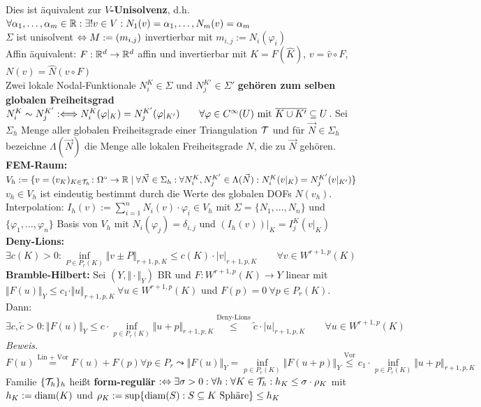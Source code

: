 \documentclass[12pt]{scrartcl}
\begin{document}
	Dies ist äquivalent zur \textbf{$V$-Unisolvenz}, d.h. $\forall\alpha_1,\ldots,\alpha_m\in\R:\exists! v\in V:N_1(v)=\alpha_1,\ldots,N_m(v)=\alpha_m$\\
	$\Sigma$ ist unisolvent $\gdw M:=(m_{i,j})$ invertierbar mit $m_{i,j}:=N_i(\varphi_i)$\\
	Affin äquivalent: $F:\R^d\to\R^d$ affin und invertierbar mit $K=F(\hat{K})$, $v=\hat{v}\circ F$, $N(v)=\hat{N}(v\circ F)$\\
	Zwei lokale Nodal-Funktionale $N_i^K\in\Sigma$ und $N_j^{K'}\in\Sigma'$ \textbf{gehören zum selben globalen Freiheitsgrad} $N_i^K\sim N_j^{K'}:\Longleftrightarrow N_i^K(\varphi|_K)=N_j^{K'}(\varphi|_{K'})\qquad\forall\varphi\in C^\infty(U)\mit\overline{K\cup K'}\subseteq U$.
	Sei $\Sigma_h$ Menge aller globalen Freiheitsgrade einer Triangulation $\T$ und für $\vec{N}\in\Sigma_h$ bezeichne $\Lambda(\vec{N})$ die Menge alle lokalen Freiheitsgrade $N$, die zu $\vec{N}$ gehören.\\
	\textbf{FEM-Raum:} $V_h:=\lbrace v=(v_{K})_{K\in\T_h}\colon\Omega^\circ\to\R\mid \forall \vec{N}\in\Sigma_h:\forall N_i^{K},N_j^{K'}\in\Lambda(\vec{N}):N_i^{K}(v|_K)=N_j^{K'}(v|_{K'})\rbrace$\\
	$v_h\in V_h$ ist eindeutig bestimmt durch die Werte des globalen DOFs $N(v_h)$.\\
	Interpolation: $I_h(v):=\sum\limits_{i=1}^n N_i(v)\cdot\varphi_i\in V_h$ mit $\Sigma=\lbrace N_1,\ldots,N_n\rbrace$ und $\lbrace\varphi_1,\ldots,\varphi_n\rbrace$ Basis von $V_h$ mit $N_i(\varphi_j)=\delta_{i,j}$ und $(I_h(v))|_K=I_j^K(v|_K)$\\
	\textbf{Deny-Lions:} $\exists c(K)>0:\inf\limits_{P\in P_r(K)}\Vert v\pm P\Vert_{r+1,p,K}\leq c(K)\cdot |v|_{r+1,p,K}\qquad\forall v\in W^{r+1,p}(K)$\\
	\textbf{Bramble-Hilbert:} Sei $(Y,\Vert\cdot\Vert_Y)$ BR und $F:W^{r+1,p}(K)\to Y$ linear mit $\big\Vert F(u)\Vert_Y\leq c_1\cdot\Vert u\Vert_{r+1,p,K}~\forall u\in W^{r+1,p}(K)$ und $F(p)=0~\forall p\in P_r(K)$.\\
	Dann: $\exists c,\tilde{c}>0:\big\Vert F(u)\big\Vert_Y
		\leq c\cdot\inf\limits_{p\in P_r(K)}\Vert u+p\Vert_{r+1,p,K}
		\overset{\text{Deny-Lions}}{\leq}
		\tilde{c}\cdot |u|_{r+1,p,K}\qquad\forall u\in W^{r+1,p}(K)$\\
	\textit{Beweis.} $F(u)\overset{\text{Lin + Vor}}{=}F(u)+F(p)\forall p\in P_r\leadsto
		\Vert F(u)\Vert_Y
		=\inf\limits_{p\in P_r(K)}\Vert F(u+p)\big\Vert_Y
		\overset{\text{Vor}}{\leq}
		c_1\cdot\inf\limits_{p\in P_r(K)}\Vert u+p\Vert_{r+1,p,K}$\\
	Familie $\lbrace\T_h\rbrace_h$ heißt \textbf{form-regulär} $:\gdw\exists\sigma>0:\forall h:\forall K\in\T_h:h_K\leq\sigma\cdot \rho_K$ mit $h_K:=\diam(K)$ und $\rho_K:=\sup\lbrace\diam(S):S\subseteq K\text{ Sphäre}\rbrace\leq h_K$
	
\end{document}
